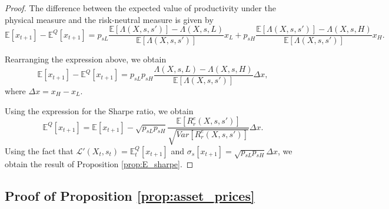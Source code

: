\begin{proof}
The difference between the expected value of productivity under the physical measure and the risk-neutral measure is given by
\begin{equation}
    \mathbb{E}[x_{t+1}] - \mathbb{E}^Q[ x_{t+1} ] =  p_{sL} \frac{\mathbb{E}[\Lambda(X,s,s')]-\Lambda(X,s,L)}{\mathbb{E}[\Lambda(X,s,s')]} x_L + p_{sH} \frac{\mathbb{E}[\Lambda(X,s,s')]-\Lambda(X,s,H)}{\mathbb{E}[\Lambda(X,s,s')]} x_H.
\end{equation}

Rearranging the expression above, we obtain
\begin{equation}
    \mathbb{E}[x_{t+1}] - \mathbb{E}^Q[ x_{t+1} ] = p_{sL}p_{sH} \frac{\Lambda(X,s,L)-\Lambda(X,s,H)}{\mathbb{E}[\Lambda(X,s,s')]} \Delta x,
\end{equation}
where $\Delta x = x_H-x_L$.

Using the expression for the Sharpe ratio, we obtain
\begin{equation}
    \mathbb{E}^Q[x_{t+1}] = \mathbb{E}[x_{t+1}] - \sqrt{p_{sL}p_{sH}}     \frac{\mathbb{E}[R^e_r(X,s,s')]}{\sqrt{Var[R^e_r(X,s,s')]}} \Delta x.
\end{equation}
Using the fact that $\mathcal{L}'(X_t, s_t) = \mathbb{E}^Q_t[x_{t+1}]$ and $\sigma_s[x_{t+1}] = \sqrt{p_{sL}p_{sH}} \Delta x$, we obtain the result of Proposition \ref{prop:E_sharpe}.
\end{proof}

\subsection{Proof of Proposition \ref{prop:asset_prices}}\label{app: proof_asset_prices}

